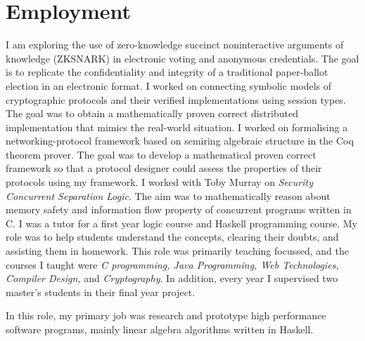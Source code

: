 \documentclass[11pt,a4paper,sans]{moderncv}        %
\begin{document}
\section{Employment}
  {I am exploring the use of zero-knowledge succinct noninteractive arguments of knowledge (ZKSNARK) in electronic voting and 
  anonymous credentials. The goal is to replicate the confidentiality and integrity of a 
  traditional paper-ballot election in an electronic format.}
  {I worked on connecting symbolic models of cryptographic protocols and their verified implementations using 
session types. The goal was to obtain a mathematically proven correct distributed implementation that 
mimics the real-world situation.}
  {I worked on formalising a networking-protocol framework based on semiring algebraic structure in 
  the Coq theorem prover. The goal was to develop a mathematical proven correct framework so that a protocol 
  designer could assess the properties of their protocols using my framework.}
  {I worked with Toby Murray  on \textit{Security Concurrent Separation Logic}. 
  The aim was 
  to mathematically reason about memory safety and information flow property of concurrent programs written in C.}
  {I was a tutor for a first year logic course and Haskell programming course. My role was to 
  help students understand the concepts, clearing their doubts, and assisting them in homework.}
{This role was primarily teaching focussed, and 
the courses I taught were \textit{C programming, Java Programming, Web Technologies, 
Compiler Design,} and \textit{Cryptography}.  
In addition,  every year I supervised two master's students in their final year project.}

{In this role, my primary job was  research and prototype high performance software programs, mainly linear algebra algorithms
written in Haskell.}
\end{document}
